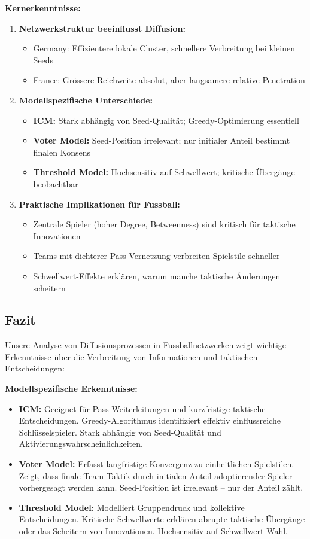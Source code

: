 \textbf{Kernerkenntnisse:}
\begin{enumerate}
  \item \textbf{Netzwerkstruktur beeinflusst Diffusion:}
  \begin{itemize}
    \item Germany: Effizientere lokale Cluster, schnellere Verbreitung bei kleinen Seeds
    \item France: Grössere Reichweite absolut, aber langsamere relative Penetration
  \end{itemize}
  \item \textbf{Modellspezifische Unterschiede:}
  \begin{itemize}
    \item \textbf{ICM:} Stark abhängig von Seed-Qualität; Greedy-Optimierung essentiell
    \item \textbf{Voter Model:} Seed-Position irrelevant; nur initialer Anteil bestimmt finalen Konsens
    \item \textbf{Threshold Model:} Hochsensitiv auf Schwellwert; kritische Übergänge beobachtbar
  \end{itemize}
  \item \textbf{Praktische Implikationen für Fussball:}
  \begin{itemize}
    \item Zentrale Spieler (hoher Degree, Betweenness) sind kritisch für taktische Innovationen
    \item Teams mit dichterer Pass-Vernetzung verbreiten Spielstile schneller
    \item Schwellwert-Effekte erklären, warum manche taktische Änderungen scheitern
  \end{itemize}
\end{enumerate}

\subsection{Fazit}

Unsere Analyse von Diffusionsprozessen in Fussballnetzwerken zeigt wichtige Erkenntnisse über die Verbreitung von Informationen und taktischen Entscheidungen:

\textbf{Modellspezifische Erkenntnisse:}
\begin{itemize}
  \item \textbf{ICM:} Geeignet für Pass-Weiterleitungen und kurzfristige taktische Entscheidungen. Greedy-Algorithmus identifiziert effektiv einflussreiche Schlüsselspieler. Stark abhängig von Seed-Qualität und Aktivierungswahrscheinlichkeiten.
  \item \textbf{Voter Model:} Erfasst langfristige Konvergenz zu einheitlichen Spielstilen. Zeigt, dass finale Team-Taktik durch initialen Anteil adoptierender Spieler vorhergesagt werden kann. Seed-Position ist irrelevant -- nur der Anteil zählt.
  \item \textbf{Threshold Model:} Modelliert Gruppendruck und kollektive Entscheidungen. Kritische Schwellwerte erklären abrupte taktische Übergänge oder das Scheitern von Innovationen. Hochsensitiv auf Schwellwert-Wahl.
\end{itemize}

